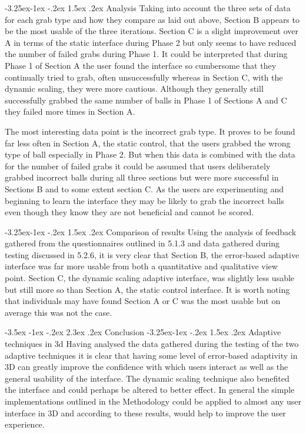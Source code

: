 \documentclass[12pt]{article}
\makeatletter
\renewcommand{\section}{\@startsection {section}{1}{\z@}%
             {-3.5ex \@plus -1ex \@minus -.2ex}%
             {2.3ex \@plus .2ex}%
             {\normalfont\Large\scshape\bfseries}}
\renewcommand{\subsection}{\@startsection{subsection}{2}{\z@}%
             {-3.25ex\@plus -1ex \@minus -.2ex}%
             {1.5ex \@plus .2ex}%
             {\normalfont\large\scshape\bfseries}}
\renewcommand{\subsubsection}{\@startsection{subsubsection}{2}{\z@}%
             {-3.25ex\@plus -1ex \@minus -.2ex}%
             {1.5ex \@plus .2ex}%
             {\normalfont\normalsize\scshape\bfseries}}
\makeatother
\begin{document}
\subsubsection{Analysis}
Taking into account the three sets of data for each grab type and how they compare as laid out above, Section B appears to be the most usable of the three iterations. Section C is a slight improvement over A in terms of the static interface during Phase 2 but only seems to have reduced the number of failed grabs during Phase 1. It could be interpreted that during Phase 1 of Section A the user found the interface so cumbersome that they continually tried to grab, often unsuccessfully whereas in Section C, with the dynamic scaling, they were more cautious. Although they generally still successfully grabbed the same number of balls in Phase 1 of Sections A and C they failed more times in Section A.

The most interesting data point is the incorrect grab type. It proves to be found far less often in Section A, the static control, that the users grabbed the wrong type of ball especially in Phase 2. But when this data is combined with the data for the number of failed grabs it could be assumed that users deliberately grabbed incorrect balls during all three sections but were more successful in Sections B and to some extent section C. As the users are experimenting and beginning to learn the interface they may be likely to grab the incorrect balls even though they know they are not beneficial and cannot be scored. 

\subsection{Comparison of results}
Using the analysis of feedback gathered from the questionnaires outlined in 5.1.3 and data gathered during testing discussed in 5.2.6, it is very clear that Section B, the error-based adaptive interface was far more usable from both a quantitative and qualitative view point. Section C, the dynamic scaling adaptive interface, was slightly less usable but still more so than Section A, the static control interface. It is worth noting that individuals may have found Section A or C was the most usable but on average this was not the case.

\section{Conclusion}
\subsection{Adaptive techniques in 3d}
Having analysed the data gathered during the testing of the two adaptive techniques it is clear that having some level of error-based adaptivity in 3D can greatly improve the confidence with which users interact as well as the general usability of the interface. The dynamic scaling technique also benefited the interface and could perhaps be altered to better effect. In general the simple implementations outlined in the Methodology could be applied to almost any user interface in 3D and according to these results, would help to improve the user experience.
\end{document}
